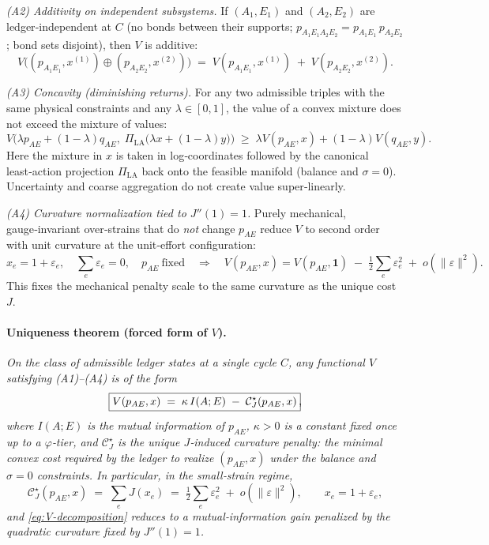 \documentclass[11pt]{article}
\begin{document}
\emph{(A2) Additivity on independent subsystems.} If $(A_1,E_1)$ and $(A_2,E_2)$ are ledger‑independent at $C$ (no bonds between their supports; $p_{A_1E_1A_2E_2}=p_{A_1E_1}\,p_{A_2E_2}$; bond sets disjoint), then $V$ is additive:
\[
V\big((p_{A_1E_1},x^{(1)})\oplus(p_{A_2E_2},x^{(2)})\big)
\;=\;
V(p_{A_1E_1},x^{(1)})\;+\;V(p_{A_2E_2},x^{(2)}).
\]

\emph{(A3) Concavity (diminishing returns).} For any two admissible triples with the same physical constraints and any $\lambda\in[0,1]$, the value of a convex mixture does not exceed the mixture of values:
\[
V\big(\lambda p_{AE}+(1-\lambda)q_{AE},\; 
\Pi_\mathrm{LA}\big(\lambda x+(1-\lambda)y\big)\big)
\;\ge\;
\lambda V(p_{AE},x)+(1-\lambda)V(q_{AE},y).
\]
Here the mixture in $x$ is taken in log‑coordinates followed by the canonical least‑action projection $\Pi_\mathrm{LA}$ back onto the feasible manifold (balance and $\sigma\!=\!0$). Uncertainty and coarse aggregation do not create value super‑linearly.

\emph{(A4) Curvature normalization tied to $J''(1)=1$.} Purely mechanical, gauge‑invariant over‑strains that do \emph{not} change $p_{AE}$ reduce $V$ to second order with unit curvature at the unit‑effort configuration:
\[
x_e=1+\varepsilon_e,\quad \sum_{e}\varepsilon_e=0,\quad p_{AE}\ \text{fixed}
\quad\Longrightarrow\quad
V(p_{AE},x)=V(p_{AE},\mathbf 1)\;-\;\tfrac12\sum_e \varepsilon_e^2\;+\;o(\|\varepsilon\|^2).
\]
This fixes the mechanical penalty scale to the same curvature as the unique cost $J$.

\paragraph{Uniqueness theorem (forced form of $V$).}
\emph{On the class of admissible ledger states at a single cycle $C$, any functional $V$ satisfying (A1)--(A4) is of the form}
\begin{equation}
\boxed{%
V(p_{AE},x)
\;=\;
\kappa\, I(A;E)\;-\;\mathcal{C}_J^\star(p_{AE},x)
}\!,
\label{eq:V-decomposition}
\end{equation}
\emph{where $I(A;E)$ is the mutual information of $p_{AE}$, $\kappa>0$ is a constant fixed once up to a $\varphi$‑tier, and $\mathcal{C}_J^\star$ is the unique $J$‑induced curvature penalty: the minimal convex cost required by the ledger to realize $(p_{AE},x)$ under the balance and $\sigma=0$ constraints. In particular, in the small‑strain regime,}
\begin{equation}
\mathcal{C}_J^\star(p_{AE},x)\;=\;\sum_{e} J(x_e)\;=\;\tfrac12\sum_e \varepsilon_e^2\;+\;o(\|\varepsilon\|^2),
\qquad x_e=1+\varepsilon_e,
\label{eq:CJ-small}
\end{equation}
\emph{and \eqref{eq:V-decomposition} reduces to a mutual‑information gain penalized by the quadratic curvature fixed by $J''(1)=1$.}
\end{document}
